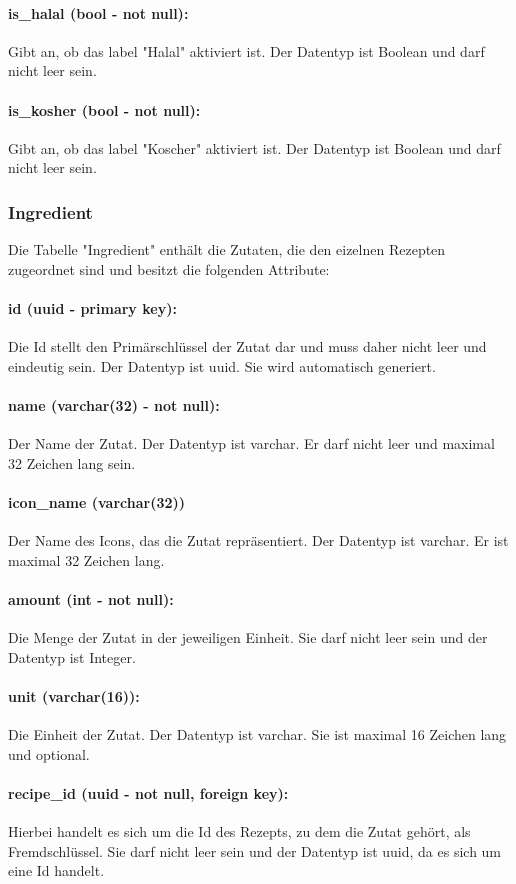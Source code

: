 \documentclass[parskip=full]{scrartcl}
\begin{document}
\paragraph{is\_halal (bool - not null):} Gibt an, ob das \Gls{label} "Halal" aktiviert ist. Der Datentyp ist Boolean und darf nicht leer sein.
\paragraph{is\_kosher (bool - not null):} Gibt an, ob das \Gls{label} "Koscher" aktiviert ist. Der Datentyp ist Boolean und darf nicht leer sein.
\newpage
\subsubsection{Ingredient}
Die Tabelle "Ingredient" enthält die Zutaten, die den eizelnen Rezepten zugeordnet sind und besitzt die folgenden Attribute:
\paragraph{id (uuid - primary key):} Die Id stellt den Primärschlüssel der Zutat dar und muss daher nicht leer und eindeutig sein. Der Datentyp ist \Gls{uuid}. Sie wird automatisch generiert. 
\paragraph{name (varchar(32) - not null):} Der Name der Zutat. Der Datentyp ist \Gls{varchar}. Er darf nicht leer und maximal 32 Zeichen lang sein.
\paragraph{icon\_name (varchar(32))} Der Name des Icons, das die Zutat repräsentiert. Der Datentyp ist \Gls{varchar}. Er ist maximal 32 Zeichen lang.
\paragraph{amount (int - not null):} Die Menge der Zutat in der jeweiligen Einheit. Sie darf nicht leer sein und der Datentyp ist Integer.
\paragraph{unit (varchar(16)):} Die Einheit der Zutat. Der Datentyp ist \Gls{varchar}. Sie ist maximal 16 Zeichen lang und optional. 
\paragraph{recipe\_id (uuid - not null, foreign key):} Hierbei handelt es sich um die Id des Rezepts, zu dem die Zutat gehört, als Fremdschlüssel. Sie darf nicht leer sein und der Datentyp ist \Gls{uuid}, da es sich um eine Id handelt.
\newpage
\end{document}
